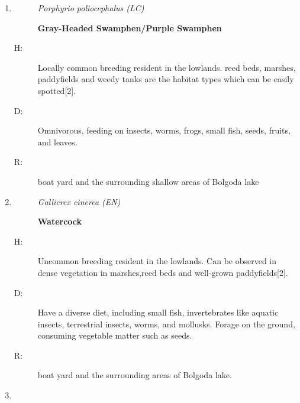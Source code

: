 \begin{itemize}
\begin{enumerate}
\begin{description}
\textbf{Common Moorhen/Eurasian Moorhen}%
\end{description}%
\begin{description}%
\item[H: ]%
Locally common breeding resident in the lowlands. Freshwater wetlands with vegetation is the preferred habitat{[}2{]}.%
\item[D: ]%
 feeds on a variety of items from berries and seeds to fish, crustaceans and spiders.%
\item[R: ]%
boat yard and the surrounding areas of Bolgoda lake.%
\end{description}%
\item%
\begin{description}%
\item[]%
\textit{Porphyrio poliocephalus (LC)}%
\item[]%
\textbf{Gray{-}Headed Swamphen/Purple Swamphen}%
\end{description}%
\begin{description}%
\item[H: ]%
Locally common breeding resident in the lowlands. reed beds, marshes, paddyfields and weedy tanks are the habitat types which can be easily spotted{[}2{]}.%
\item[D: ]%
Omnivorous, feeding on insects, worms, frogs, small fish, seeds, fruits, and leaves.%
\item[R: ]%
boat yard and the surrounding shallow areas of Bolgoda lake%
\end{description}%
\item%
\begin{description}%
\item[]%
\textit{Gallicrex cinerea (EN)}%
\item[]%
\textbf{Watercock}%
\end{description}%
\begin{description}%
\item[H: ]%
Uncommon breeding resident in the lowlands. Can be observed in dense vegetation in marshes,reed beds and well{-}grown paddyfields{[}2{]}.%
\item[D: ]%
Have a diverse diet, including small fish, invertebrates like aquatic insects, terrestrial insects, worms, and mollusks. Forage on the ground, consuming vegetable matter such as seeds.%
\item[R: ]%
boat yard and the surrounding areas of Bolgoda lake.%
\end{description}%
\item%
\begin{description}%

\end{description}
\end{enumerate}
\end{itemize}
